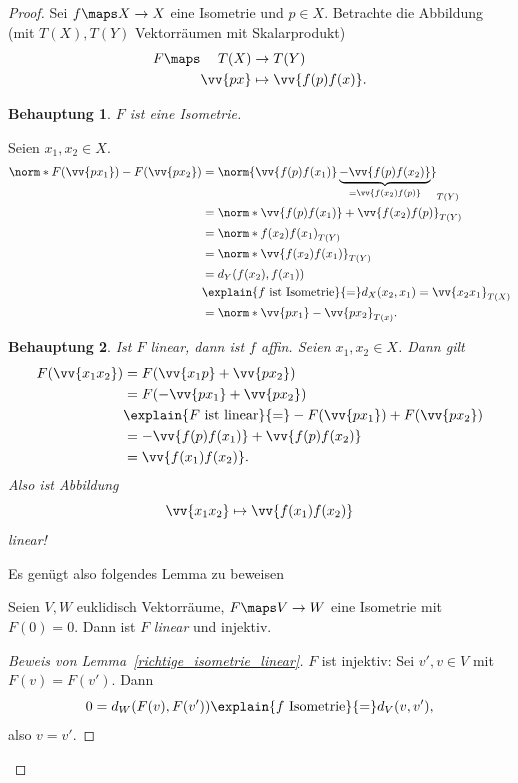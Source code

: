 \begin{proof}
  Sei \( f\maps X\to X \) eine Isometrie und \( p\in X \). Betrachte die Abbildung (mit \( T(X),T(Y) \) Vektorräumen mit Skalarprodukt)
  \begin{equation*}
    F\maps \begin{aligned}[t]
      T(X)&\to T(Y)\\
      \vv{px} &\mapsto \vv{f(p)f(x)}.
    \end{aligned}
  \end{equation*}
  \newtheorem{beweisbehauptung}{Behauptung}[satz]
  \renewcommand\thebeweisbehauptung{\arabic{beweisbehauptung}}
  \begin{beweisbehauptung}
    \( F \) ist eine Isometrie.
  \end{beweisbehauptung}
  Seien \( x_1,x_2\in X \).
  \begin{align*}
    \norm*{F(\vv{px_1})-F(\vv{px_2})}&=\norm{\vv{f(p)f(x_1)}\underbrace{-\vv{f(p)f(x_2)}}_{=\vv{f(x_2)f(p)}}}_{T(Y)}\\
    &=\norm*{\vv{f(p) f(x_1)}+\vv{f(x_2) f(p)}}_{T(Y)}\\
    &=\norm*{f(x_2)f(x_1)}_{T(Y)}\\
    &=\norm*{\vv{f(x_2) f(x_1)}}_{T(Y)}\\
    &=d_Y(f(x_2), f(x_1))\\
    &\explain{\text{\( f \) ist Isometrie}}{=} d_X(x_2,x_1)=\vv{x_2 x_1}_{T(X)}\\
    &=\norm*{\vv{px_1}-\vv{px_2}}_{T(x)}.
  \end{align*}
  \begin{beweisbehauptung}
    Ist \( F \) \emph{linear}, dann ist \( f \) affin. Seien \( x_1,x_2\in X \). Dann gilt 
    \begin{align*}
      F(\vv{x_1 x_2})&=F(\vv{x_1 p}+\vv{p x_2})\\
      &=F(-\vv{px_1}+\vv{px_2})\\
      &\explain{\text{\( F \) ist linear}}{=}-F(\vv{px_1})+F(\vv{px_2})\\
      &=-\vv{f(p)f(x_1)}+\vv{f(p) f(x_2)}\\
      &=\vv{f(x_1)f(x_2)}.
    \end{align*}
    Also ist Abbildung
    \begin{equation*}
      \vv{x_1 x_2}\mapsto \vv{f(x_1) f(x_2)}
    \end{equation*}
    linear!
  \end{beweisbehauptung}
  Es genügt also folgendes Lemma zu beweisen
  \begin{lemma}\label{richtige_isometrie_linear}
    Seien \( V,W \) euklidisch Vektorräume, \( F\maps V\to W \) eine Isometrie mit \( F(0)=0 \). Dann ist \( F \) \emph{linear} und injektiv.
  \end{lemma}
  \begin{proof}[Beweis von Lemma~\ref{richtige_isometrie_linear}]
    \( F \) ist injektiv: Sei \( v',v\in V \) mit \( F(v)=F(v') \). Dann
    \begin{equation*}
      0=d_W(F(v),F(v'))\explain{\text{\( f \) Isometrie}}{=}d_V (v,v'),
    \end{equation*}
    also \( v=v' \).


\end{proof}
\end{proof}
